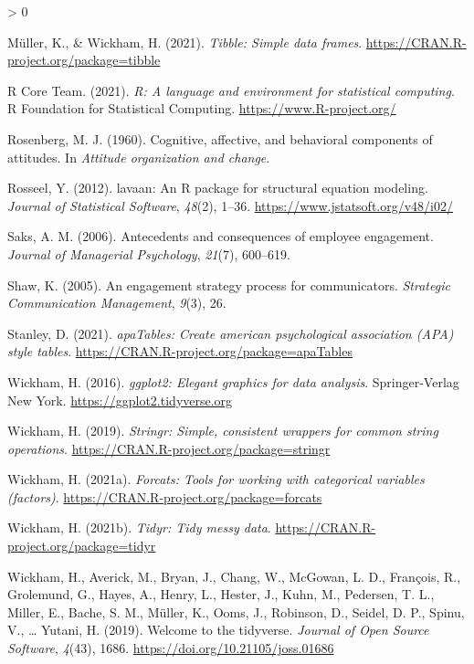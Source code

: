 \documentclass[
  english,
  man]{apa7}
\newlength{\cslhangindent}
\newenvironment{CSLReferences}[2] %
 {%
  \setlength{\parindent}{0pt}
  \ifodd #1 \everypar{\setlength{\hangindent}{\cslhangindent}}\ignorespaces\fi
  \ifnum #2 > 0
  \setlength{\parskip}{#2\baselineskip}
  \fi
 }%
 {}
\begin{document}
\begin{CSLReferences}{1}{0}
\leavevmode\hypertarget{ref-R-tibble}{}%
Müller, K., \& Wickham, H. (2021). \emph{Tibble: Simple data frames}. \url{https://CRAN.R-project.org/package=tibble}

\leavevmode\hypertarget{ref-R-base}{}%
R Core Team. (2021). \emph{R: A language and environment for statistical computing}. R Foundation for Statistical Computing. \url{https://www.R-project.org/}

\leavevmode\hypertarget{ref-rosenberg_cognitive_1960}{}%
Rosenberg, M. J. (1960). Cognitive, affective, and behavioral components of attitudes. In \emph{Attitude organization and change}.

\leavevmode\hypertarget{ref-R-lavaan}{}%
Rosseel, Y. (2012). {lavaan}: An {R} package for structural equation modeling. \emph{Journal of Statistical Software}, \emph{48}(2), 1--36. \url{https://www.jstatsoft.org/v48/i02/}

\leavevmode\hypertarget{ref-saks2006antecedents}{}%
Saks, A. M. (2006). Antecedents and consequences of employee engagement. \emph{Journal of Managerial Psychology}, \emph{21}(7), 600--619.

\leavevmode\hypertarget{ref-shaw2005engagement}{}%
Shaw, K. (2005). An engagement strategy process for communicators. \emph{Strategic Communication Management}, \emph{9}(3), 26.

\leavevmode\hypertarget{ref-R-apaTables}{}%
Stanley, D. (2021). \emph{apaTables: Create american psychological association (APA) style tables}. \url{https://CRAN.R-project.org/package=apaTables}

\leavevmode\hypertarget{ref-R-ggplot2}{}%
Wickham, H. (2016). \emph{ggplot2: Elegant graphics for data analysis}. Springer-Verlag New York. \url{https://ggplot2.tidyverse.org}

\leavevmode\hypertarget{ref-R-stringr}{}%
Wickham, H. (2019). \emph{Stringr: Simple, consistent wrappers for common string operations}. \url{https://CRAN.R-project.org/package=stringr}

\leavevmode\hypertarget{ref-R-forcats}{}%
Wickham, H. (2021a). \emph{Forcats: Tools for working with categorical variables (factors)}. \url{https://CRAN.R-project.org/package=forcats}

\leavevmode\hypertarget{ref-R-tidyr}{}%
Wickham, H. (2021b). \emph{Tidyr: Tidy messy data}. \url{https://CRAN.R-project.org/package=tidyr}

\leavevmode\hypertarget{ref-R-tidyverse}{}%
Wickham, H., Averick, M., Bryan, J., Chang, W., McGowan, L. D., François, R., Grolemund, G., Hayes, A., Henry, L., Hester, J., Kuhn, M., Pedersen, T. L., Miller, E., Bache, S. M., Müller, K., Ooms, J., Robinson, D., Seidel, D. P., Spinu, V., \ldots{} Yutani, H. (2019). Welcome to the {tidyverse}. \emph{Journal of Open Source Software}, \emph{4}(43), 1686. \url{https://doi.org/10.21105/joss.01686}


\end{CSLReferences}
\end{document}
